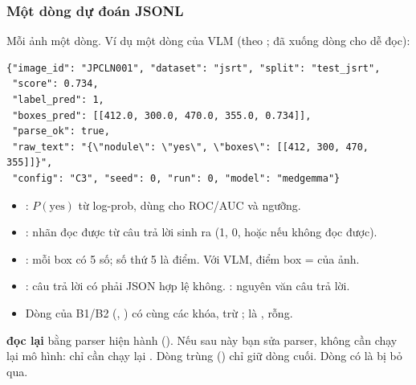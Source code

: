\subsubsection*{Một dòng dự đoán JSONL}

Mỗi ảnh một dòng. Ví dụ một dòng của VLM (theo ; đã xuống dòng cho dễ đọc):

\begin{lstlisting}
{"image_id": "JPCLN001", "dataset": "jsrt", "split": "test_jsrt",
 "score": 0.734,
 "label_pred": 1,
 "boxes_pred": [[412.0, 300.0, 470.0, 355.0, 0.734]],
 "parse_ok": true,
 "raw_text": "{\"nodule\": \"yes\", \"boxes\": [[412, 300, 470, 355]]}",
 "config": "C3", "seed": 0, "run": 0, "model": "medgemma"}
\end{lstlisting}

\begin{itemize}
\item {}: $P(\text{yes})$ từ log-prob, dùng cho ROC/AUC và ngưỡng.
\item {}: nhãn đọc được từ câu trả lời sinh ra (1, 0, hoặc  nếu không đọc được).
\item {}: mỗi box có 5 số; số thứ 5 là điểm. Với VLM, điểm box =  của ảnh.
\item {}: câu trả lời có phải JSON hợp lệ không. : nguyên văn câu trả lời.
\item Dòng của B1/B2 (, ) có cùng các khóa, trừ ;  là ,  rỗng.
\end{itemize}

\begin{keybox}
 \textbf{đọc lại}  bằng parser hiện hành (). Nếu sau này bạn sửa parser,
không cần chạy lại mô hình: chỉ cần chạy lại . Dòng trùng () chỉ giữ dòng cuối.
Dòng có  là  bị bỏ qua.
\end{keybox}
